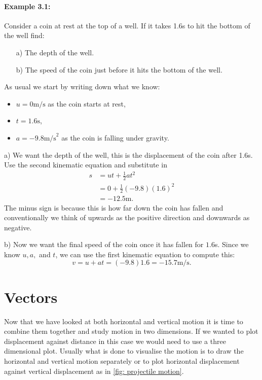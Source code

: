 \documentclass[a4paper,12pt]{book}
\begin{document}
\paragraph{Example 3.1:} Consider a coin at rest at the top of a well. If it takes 1.6s to hit the bottom of the well find:
\begin{itemize}
\setlength{\itemsep}{-5pt}
    \item[a)] The depth of the well.
    \item[b)] The speed of the coin just before it hits the bottom of the well.
\end{itemize}

As usual we start by writing down what we know:
\begin{itemize}
\setlength{\itemsep}{-5pt}
    \item $u=0\text{m/s}$ as the coin starts at rest,
    \item $t=1.6\text{s}$,
    \item $a=-9.8\text{m/s}^{2}$ as the coin is falling under gravity.
\end{itemize}

a) We want the depth of the well, this is the displacement of the coin after 1.6s. Use the second kinematic equation and substitute in 
\begin{align*}
    s   &=ut+\frac{1}{2}a t^{2}\\
        &=0 +\frac{1}{2}(-9.8)(1.6)^{2}\\
        &=-12.5\text{m}.
\end{align*}
The minus sign is because this is how far down the coin has fallen and conventionally we think of upwards as the positive direction and downwards as negative.

b) Now we want the final speed of the coin once it has fallen for $1.6$s. Since we know $u,a,$ and $t$, we can use the first kinematic equation to compute this:
\begin{equation*}
    v=u+at =(-9.8)1.6=-15.7\text{m/s}.
\end{equation*}

\section{Vectors}
Now that we have looked at both horizontal and vertical motion it is time to combine them together and study motion in two dimensions. If we wanted to plot displacement against distance in this case we would need to use a three dimensional plot. Usually what is done to visualise the motion is to draw the horizontal and vertical motion separately or to plot horizontal displacement against vertical displacement as in \cref{fig: projectile motion}.\\
\end{document}

